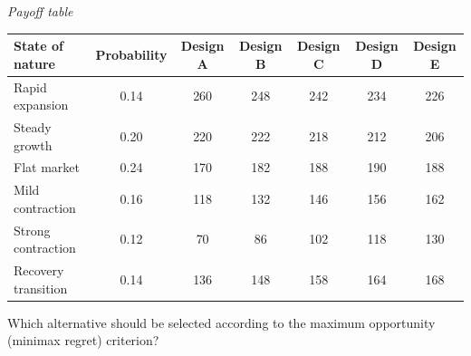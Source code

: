 \begin{ExamProblems}
		\begin{center}
			\textit{Payoff table}
			\begin{tabular}{l c c c c c c}
				\toprule
				State of nature & Probability & Design A & Design B & Design C & Design D & Design E \\
				\midrule
				Rapid expansion & 0.14 & 260 & 248 & 242 & 234 & 226 \\
				Steady growth & 0.20 & 220 & 222 & 218 & 212 & 206 \\
				Flat market & 0.24 & 170 & 182 & 188 & 190 & 188 \\
				Mild contraction & 0.16 & 118 & 132 & 146 & 156 & 162 \\
				Strong contraction & 0.12 & 70 & 86 & 102 & 118 & 130 \\
				Recovery transition & 0.14 & 136 & 148 & 158 & 164 & 168 \\
				\bottomrule
			\end{tabular}
		\end{center}

		Which alternative should be selected according to the maximum opportunity (minimax regret) criterion?


\end{ExamProblems}
